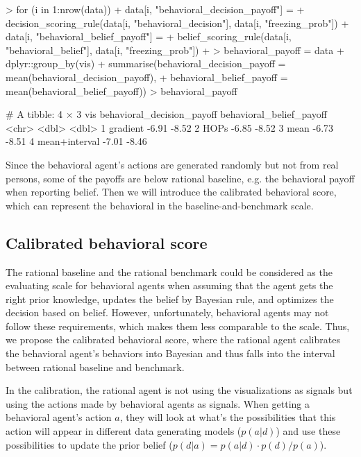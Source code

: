 \documentclass{article}
\begin{document}
\begin{Schunk}
\begin{Sinput}
> for (i in 1:nrow(data)) {
+   data[i, "behavioral_decision_payoff"] = 
+     decision_scoring_rule(data[i, "behavioral_decision"], data[i, "freezing_prob"])
+   data[i, "behavioral_belief_payoff"] = 
+     belief_scoring_rule(data[i, "behavioral_belief"], data[i, "freezing_prob"])
+ }
> behavioral_payoff = data %>%
+   dplyr::group_by(vis) %>%
+   summarise(behavioral_decision_payoff = mean(behavioral_decision_payoff),
+             behavioral_belief_payoff = mean(behavioral_belief_payoff))
> behavioral_payoff
\end{Sinput}
\begin{Soutput}
# A tibble: 4 × 3
  vis           behavioral_decision_payoff behavioral_belief_payoff
  <chr>                              <dbl>                    <dbl>
1 gradient                           -6.91                    -8.52
2 HOPs                               -6.85                    -8.52
3 mean                               -6.73                    -8.51
4 mean+interval                      -7.01                    -8.46
\end{Soutput}
\end{Schunk}

Since the behavioral agent's actions are generated randomly but not from real persons, some of the payoffs are below rational baseline, e.g. the behavioral payoff when reporting belief. Then we will introduce the calibrated behavioral score, which can represent the behavioral in the baseline-and-benchmark scale.

\subsection{Calibrated behavioral score}

The rational baseline and the rational benchmark could be considered as the evaluating scale for behavioral agents when assuming that the agent gets the right prior knowledge, updates the belief by Bayesian rule, and optimizes the decision based on belief. However, unfortunately, behavioral agents may not follow these requirements, which makes them less comparable to the scale. Thus, we propose the calibrated behavioral score, where the rational agent calibrates the behavioral agent's behaviors into Bayesian and thus falls into the interval between rational baseline and benchmark.

In the calibration, the rational agent is not using the visualizations as signals but using the actions made by behavioral agents as signals. When getting a behavioral agent's action $a$, they will look at what's the possibilities that this action will appear in different data generating models ($p(a|d)$) and use these possibilities to update the prior belief ($p(d|a) = p(a|d) \cdot p(d) / p(a)$).
\end{document}
